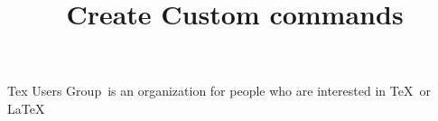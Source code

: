 \documentclass{article}
\title{Create Custom commands}
\newcommand{\TUG}{Tex Users Group}
\begin{document}
	\maketitle
	
	\TUG\ is an organization for people who are interested in \TeX\ or \LaTeX\
	
\end{document}
